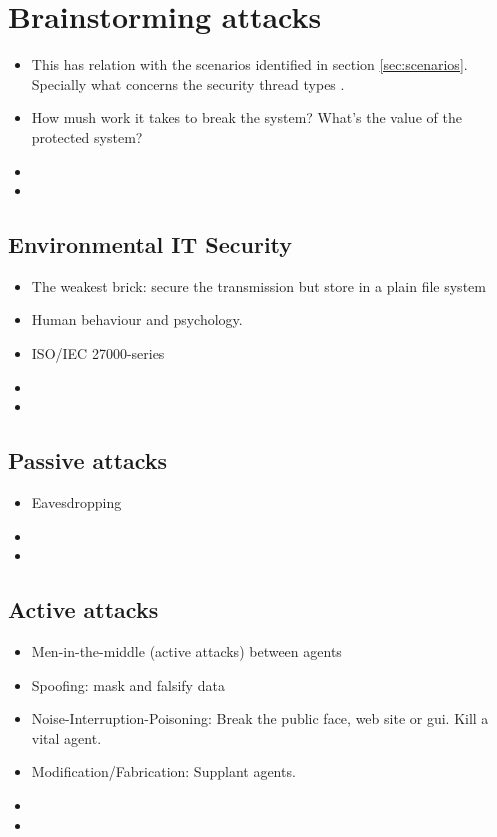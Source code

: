 \documentclass[10pt,a4paper,twoside]{llncs}
\begin{document}
\section{Brainstorming attacks \label{sec:attacks}}

\begin{itemize}
    \item This has relation with the scenarios identified in section \ref{sec:scenarios}. Specially what concerns the security thread types \cite{SecEngRossAnderson}.
    \item How mush work it takes to break the system? What's the value of the protected system?
    \item 
    \item
\end{itemize}


\subsection{Environmental IT Security \label{sec:environment}}

\begin{itemize}
    \item The weakest brick: secure the transmission but store in a plain file system
    \item Human behaviour and psychology.
    \item ISO/IEC 27000-series
    \item 
    \item
\end{itemize}


\subsection{Passive attacks \label{sec:passiveAttacks}}

\begin{itemize}
    \item Eavesdropping
    \item 
    \item 
\end{itemize}


\subsection{Active attacks \label{sec:activeAttacks}}

\begin{itemize}
    \item Men-in-the-middle (active attacks) between agents
    \item Spoofing: mask and falsify data
    \item Noise-Interruption-Poisoning: Break the public face, web site or gui. Kill a vital agent.
    \item Modification/Fabrication: Supplant agents.
    \item 
    \item 
\end{itemize}
\end{document}
